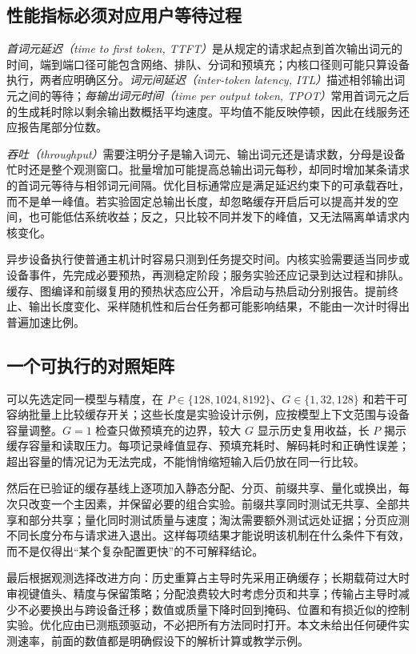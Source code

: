 \documentclass[UTF8,12pt,a4paper,fontset=fandol]{ctexart}
\begin{document}
\subsection{性能指标必须对应用户等待过程}

\emph{首词元延迟（time to first token, TTFT）}是从规定的请求起点到首次输出词元的时间，端到端口径可能包含网络、排队、分词和预填充；内核口径则可能只算设备执行，两者应明确区分。\emph{词元间延迟（inter-token latency, ITL）}描述相邻输出词元之间的等待；\emph{每输出词元时间（time per output token, TPOT）}常用首词元之后的生成耗时除以剩余输出数概括平均速度。平均值不能反映停顿，因此在线服务还应报告尾部分位数。

\emph{吞吐（throughput）}需要注明分子是输入词元、输出词元还是请求数，分母是设备忙时还是整个观测窗口。批量增加可能提高总输出词元每秒，却同时增加某条请求的首词元等待与相邻词元间隔。优化目标通常应是满足延迟约束下的可承载吞吐，而不是单一峰值。若实验固定总输出长度，却忽略缓存开启后可以提高并发的空间，也可能低估系统收益；反之，只比较不同并发下的峰值，又无法隔离单请求内核变化。

异步设备执行使普通主机计时容易只测到任务提交时间。内核实验需要适当同步或设备事件，先完成必要预热，再测稳定阶段；服务实验还应记录到达过程和排队。缓存、图编译和前缀复用的预热状态应公开，冷启动与热启动分别报告。提前终止、输出长度变化、采样随机性和后台任务都可能影响结果，不能由一次计时得出普遍加速比例。

\subsection{一个可执行的对照矩阵}

可以先选定同一模型与精度，在 $P\in\{128,1024,8192\}$、$G\in\{1,32,128\}$ 和若干可容纳批量上比较缓存开关；这些长度是实验设计示例，应按模型上下文范围与设备容量调整。$G=1$ 检查只做预填充的边界，较大 $G$ 显示历史复用收益，长 $P$ 揭示缓存容量和读取压力。每项记录峰值显存、预填充耗时、解码耗时和正确性误差；超出容量的情况记为无法完成，不能悄悄缩短输入后仍放在同一行比较。

然后在已验证的缓存基线上逐项加入静态分配、分页、前缀共享、量化或换出，每次只改变一个主因素，并保留必要的组合实验。前缀共享同时测试无共享、全部共享和部分共享；量化同时测试质量与速度；淘汰需要额外测试远处证据；分页应测不同长度分布与请求进入退出。这样每项结果才能说明该机制在什么条件下有效，而不是仅得出“某个复杂配置更快”的不可解释结论。

最后根据观测选择改进方向：历史重算占主导时先采用正确缓存；长期载荷过大时审视键值头、精度与保留策略；分配浪费较大时考虑分页和共享；传输占主导时减少不必要换出与跨设备迁移；数值或质量下降时回到掩码、位置和有损近似的控制实验。优化应由已测瓶颈驱动，不必把所有方法同时打开。本文未给出任何硬件实测速率，前面的数值都是明确假设下的解析计算或教学示例。
\end{document}
